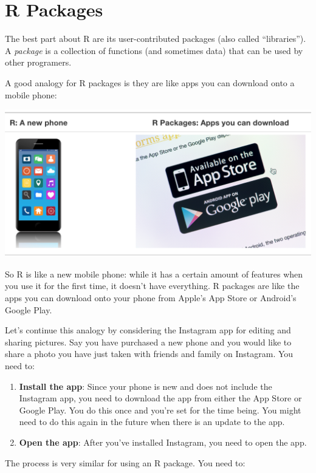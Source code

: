 \documentclass[]{book}
\providecommand{\tightlist}{%
  \setlength{\itemsep}{0pt}\setlength{\parskip}{0pt}}
\begin{document}
\hypertarget{r-packages-1}{%
\section{R Packages}\label{r-packages-1}}

The best part about R are its user-contributed packages (also called ``libraries''). A \emph{package} is a collection of functions (and sometimes data) that can be used by other programers.

A good analogy for R packages is they are like apps you can download onto a mobile phone:

\begin{center}\includegraphics[width=0.7\linewidth]{img/R_vs_R_packages} \end{center}

So R is like a new mobile phone: while it has a certain amount of features when you use it for the first time, it doesn't have everything. R packages are like the apps you can download onto your phone from Apple's App Store or Android's Google Play.

Let's continue this analogy by considering the Instagram app for editing and sharing pictures. Say you have purchased a new phone and you would like to share a photo you have just taken with friends and family on Instagram. You need to:

\begin{enumerate}
\def\labelenumi{\arabic{enumi}.}
\tightlist
\item
  \textbf{Install the app}: Since your phone is new and does not include the Instagram app, you need to download the app from either the App Store or Google Play. You do this once and you're set for the time being. You might need to do this again in the future when there is an update to the app.
\item
  \textbf{Open the app}: After you've installed Instagram, you need to open the app.
\end{enumerate}

The process is very similar for using an R package. You need to:
\end{document}
